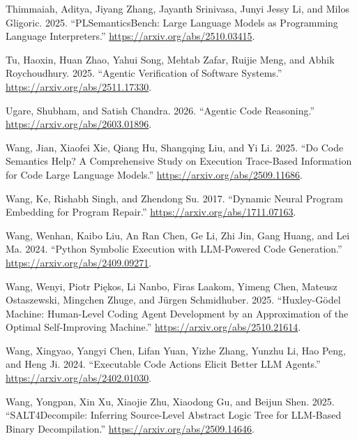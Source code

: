 \documentclass{article}
\newlength{\cslhangindent}
\newenvironment{CSLReferences}[2]
 {%
  \setlength{\parindent}{0pt}
  \everypar{\setlength{\hangindent}{\cslhangindent}}\ignorespaces
 }
 {\par}
\begin{document}
\begin{CSLReferences}{1}{0}
\leavevmode{}%
Thimmaiah, Aditya, Jiyang Zhang, Jayanth Srinivasa, Junyi Jessy Li, and
Milos Gligoric. 2025. {``PLSemanticsBench: Large Language Models as
Programming Language Interpreters.''}
\url{https://arxiv.org/abs/2510.03415}.

\leavevmode{}%
Tu, Haoxin, Huan Zhao, Yahui Song, Mehtab Zafar, Ruijie Meng, and Abhik
Roychoudhury. 2025. {``Agentic Verification of Software Systems.''}
\url{https://arxiv.org/abs/2511.17330}.

\leavevmode{}%
Ugare, Shubham, and Satish Chandra. 2026. {``Agentic Code Reasoning.''}
\url{https://arxiv.org/abs/2603.01896}.

\leavevmode{}%
Wang, Jian, Xiaofei Xie, Qiang Hu, Shangqing Liu, and Yi Li. 2025. {``Do
Code Semantics Help? A Comprehensive Study on Execution Trace-Based
Information for Code Large Language Models.''}
\url{https://arxiv.org/abs/2509.11686}.

\leavevmode{}%
Wang, Ke, Rishabh Singh, and Zhendong Su. 2017. {``Dynamic Neural
Program Embedding for Program Repair.''}
\url{https://arxiv.org/abs/1711.07163}.

\leavevmode{}%
Wang, Wenhan, Kaibo Liu, An Ran Chen, Ge Li, Zhi Jin, Gang Huang, and
Lei Ma. 2024. {``Python Symbolic Execution with LLM-Powered Code
Generation.''} \url{https://arxiv.org/abs/2409.09271}.

\leavevmode{}%
Wang, Wenyi, Piotr Piękos, Li Nanbo, Firas Laakom, Yimeng Chen, Mateusz
Ostaszewski, Mingchen Zhuge, and Jürgen Schmidhuber. 2025.
{``Huxley-Gödel Machine: Human-Level Coding Agent Development by an
Approximation of the Optimal Self-Improving Machine.''}
\url{https://arxiv.org/abs/2510.21614}.

\leavevmode{}%
Wang, Xingyao, Yangyi Chen, Lifan Yuan, Yizhe Zhang, Yunzhu Li, Hao
Peng, and Heng Ji. 2024. {``Executable Code Actions Elicit Better LLM
Agents.''} \url{https://arxiv.org/abs/2402.01030}.

\leavevmode{}%
Wang, Yongpan, Xin Xu, Xiaojie Zhu, Xiaodong Gu, and Beijun Shen. 2025.
{``SALT4Decompile: Inferring Source-Level Abstract Logic Tree for
LLM-Based Binary Decompilation.''}
\url{https://arxiv.org/abs/2509.14646}.


\end{CSLReferences}
\end{document}
